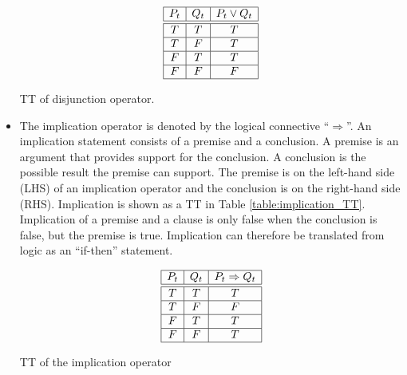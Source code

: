 \begin{itemize}
\begin{table}[H]
\begin{displaymath}  
		  \begin{array}{|c|c|c|}\hline
		    P_t & Q_t &  P_t \vee Q_t   \\\hline\hline
		    T & T & T\\\hline
		    T & F & T\\\hline
		    F & T & T\\\hline
		    F & F & F\\\hline
		  \end{array}
\end{displaymath}
\caption{TT of disjunction operator.}
\label{table: disjunction_TT}
\end{table}

\vspace{-1cm}
	
	
	
	\item The implication operator is denoted by the logical connective ``$\Rightarrow$''.
	 An implication statement consists of a premise and a conclusion. A premise is an argument that provides support for the conclusion. A conclusion is the possible result the premise can support. The premise is on the left-hand side (LHS) of an implication operator and the conclusion is on the right-hand side (RHS). Implication is shown as a TT in Table \ref{table:implication_TT}. Implication of a premise and a clause is only false when the conclusion is false, but the premise is true. Implication can therefore be translated from logic as an ``if-then'' statement.
	
\vspace{-0.4 cm}	
	
\begin{table}[H]
      \centering 
       \begin{displaymath}  %
		  \begin{array}{|c|c|c|}\hline
		    P_t & Q_t & P_t \Rightarrow Q_t \\\hline\hline
		    T & T & T \\\hline
		    T & F & F \\\hline
		    F & T & T \\\hline
		    F & F & T \\\hline
		  \end{array}
		\end{displaymath}
		\caption{TT of the implication operator}
		\label{table:implication_TT}
\end{table}


\end{itemize}
